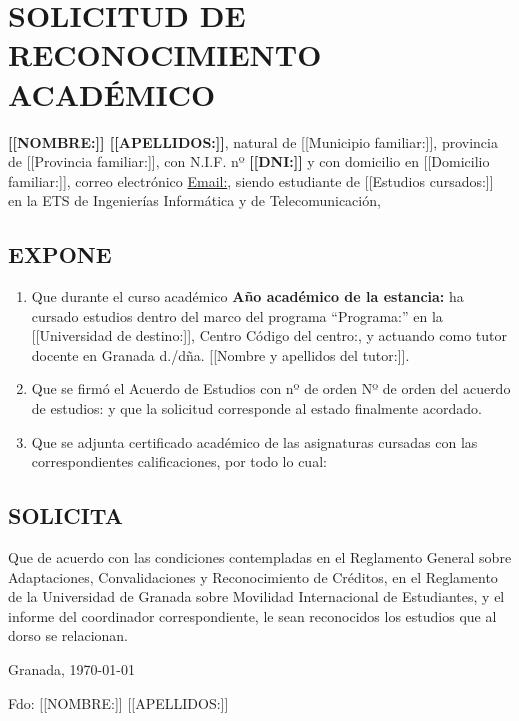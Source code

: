 \documentclass[paper = a4,10pt,twoside]{book}
\begin{document}
\section*{SOLICITUD DE RECONOCIMIENTO ACADÉMICO}
\textbf{[[NOMBRE:]] [[APELLIDOS:]]}, natural de [[Municipio familiar:]], provincia de [[Provincia familiar:]], con N.I.F. nº \textbf{[[DNI:]]} y con domicilio en [[Domicilio familiar:]], correo electrónico \href{mailto:{{Email:}}}{{{Email:}}}, siendo estudiante de [[Estudios cursados:]] en la ETS de Ingenierías Informática y de Telecomunicación,

\subsection*{EXPONE}
\begin{enumerate}
\item Que durante el curso académico \textbf{ {{Año académico de la estancia:}} } ha cursado estudios dentro del marco del programa ``{{Programa:}}'' en la [[Universidad de destino:]], Centro {{Código del centro:}}, y actuando como tutor docente en Granada d./dña. [[Nombre y apellidos del tutor:]].
\item Que se firmó el Acuerdo de Estudios con nº de orden {{Nº de orden del acuerdo de estudios:}} y que la solicitud
  corresponde al estado finalmente acordado.
\item Que se adjunta certificado académico de las asignaturas cursadas con las
  correspondientes calificaciones, por todo lo cual:
\end{enumerate}
\subsection*{SOLICITA}
Que de acuerdo con las condiciones contempladas en el Reglamento General sobre Adaptaciones,
Convalidaciones y Reconocimiento de Créditos, en el Reglamento de la Universidad de Granada
sobre Movilidad Internacional de Estudiantes, y el informe del coordinador correspondiente, le
sean reconocidos los estudios que al dorso se relacionan.

\begin{center}
  \vspace{1cm}
  Granada, \today

  \vspace{2cm}
  Fdo: [[NOMBRE:]] [[APELLIDOS:]]
\end{center}


\newpage
\end{document}
